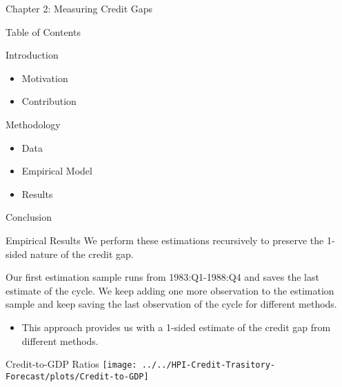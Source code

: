 \documentclass[
  ignorenonframetext,
]{beamer}
\providecommand{\tightlist}{%
  \setlength{\itemsep}{0pt}\setlength{\parskip}{0pt}}
\begin{document}
\begin{frame}{Chapter 2: Measuring Credit Gaps}
\protect\hypertarget{chapter-2-measuring-credit-gaps}{}
\begin{block}{Table of Contents}
\protect\hypertarget{table-of-contents}{}
\begin{block}{Introduction}
\protect\hypertarget{introduction}{}
\begin{itemize}
\tightlist
\item
  Motivation
\item
  Contribution
\end{itemize}
\end{block}

\begin{block}{Methodology}
\protect\hypertarget{methodology}{}
\begin{itemize}
\tightlist
\item
  Data
\item
  Empirical Model
\item
  Results
\end{itemize}
\end{block}

\begin{block}{Conclusion}
\protect\hypertarget{conclusion}{}
\end{block}
\end{block}
\end{frame}

\begin{frame}{Empirical Results}
\protect\hypertarget{empirical-results-2}{}
We perform these estimations recursively to preserve the 1-sided nature
of the credit gap.

Our first estimation sample runs from 1983:Q1-1988:Q4 and saves the last
estimate of the cycle. We keep adding one more observation to the
estimation sample and keep saving the last observation of the cycle for
different methods.

\begin{itemize}
\tightlist
\item
  This approach provides us with a 1-sided estimate of the credit gap
  from different methods.
\end{itemize}
\end{frame}

\begin{frame}{Credit-to-GDP Ratios}
\protect\hypertarget{credit-to-gdp-ratios}{}
\texttt{[image: ../../HPI-Credit-Trasitory-Forecast/plots/Credit-to-GDP]}
\end{frame}
\end{document}
